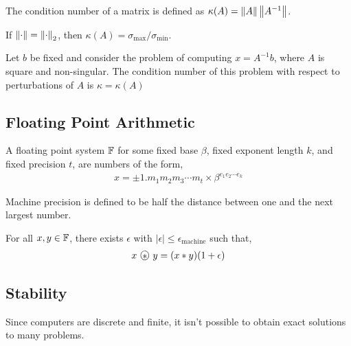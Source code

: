 \documentclass[12pt]{article}
\begin{document}
\begin{definition}
The condition number of a matrix is defined as \( \kappa(A) = \left\lVert A\right\rVert\left\lVert A^{-1}\right\rVert \).
\end{definition}

\begin{theorem}
If \( \left\lVert\cdot\right\rVert = \left\lVert\cdot\right\rVert_2 \), then \( \kappa(A) = \sigma_{\text{max}} / \sigma_{\text{min}} \).
\end{theorem}

\begin{theorem}
Let \( b \) be fixed and consider the problem of computing \( x = A^{-1}b \), where \( A \) is square and non-singular. The condition number of this problem with respect to perturbations of \( A \) is \( \kappa = \kappa(A) \)
\end{theorem}

\subsection{Floating Point Arithmetic}

\begin{definition}
A floating point system \( \mathbb{F} \) for some fixed base \( \beta \), fixed exponent length \( k \), and fixed precision \( t \), are numbers of the form,
\begin{align*}
    x = \pm 1.m_1m_2m_3 \cdots m_t \times \beta^{e_1e_2\cdots e_k}
\end{align*}
\end{definition}

\begin{definition}
Machine precision is defined to be half the distance between one and the next largest number.
\end{definition}

\begin{theorem}
For all \( x,y\in\mathbb{F} \), there exists \( \epsilon \) with \( |\epsilon| \leq \epsilon_{\text{machine}} \) such that,
\begin{align*}
    x ~\raisebox{.5pt}{\textcircled{\raisebox{-4pt} {*}}} ~ y = (x*y)(1+\epsilon)
\end{align*}
\end{theorem}

\subsection{Stability}
Since computers are discrete and finite, it isn't possible to obtain exact solutions to many problems.
\end{document}
